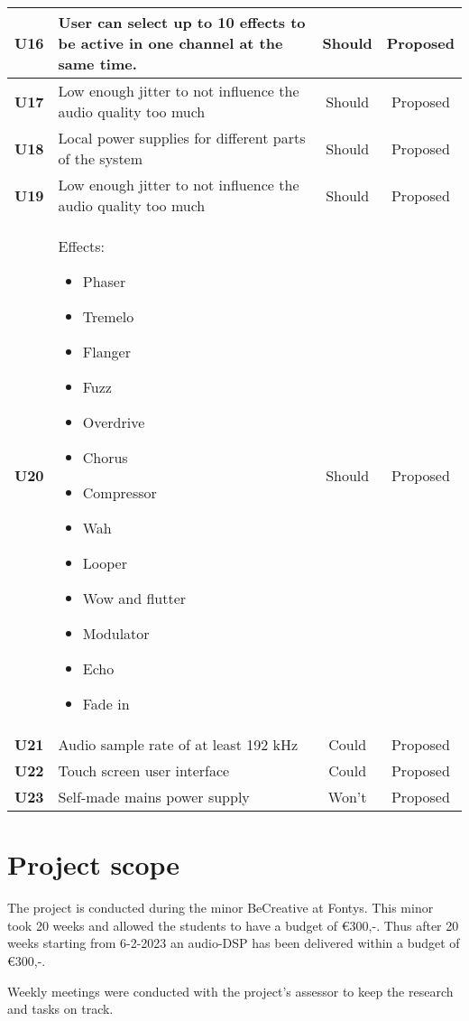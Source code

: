 \begin{longtable}{|c|p{10cm}|c|c|}
		\textbf{U16} & User can select up to 10 effects to be active in one channel at the same time. 								& Should & Proposed\\ \hline
		\textbf{U17} & Low enough jitter to not influence the audio quality too much 												& Should & Proposed\\ \hline
		\textbf{U18} & Local power supplies for different parts of the system 														& Should & Proposed\\ \hline
		\textbf{U19} & Low enough jitter to not influence the audio quality too much 												& Should & Proposed\\ \hline
		\textbf{U20} & Effects:\newline
		\begin{itemize}
			\setlength\itemsep{-0.3em}
			\item Phaser
			\item Tremelo
			\item Flanger
			\item Fuzz
			\item Overdrive
			\item Chorus
			\item Compressor
			\item Wah
			\item Looper
			\item Wow and flutter
			\item Modulator
			\item Echo
			\item Fade in
		\end{itemize}																												& Should & Proposed\\ \hline
		\textbf{U21} & Audio sample rate of at least 192 kHz 																		& Could  & Proposed\\ \hline
		\textbf{U22} & Touch screen user interface 																					& Could  & Proposed\\ \hline
		\textbf{U23} & Self-made mains power supply  																				& Won't  & Proposed\\ \hline
	\end{longtable}

\section{Project scope}

The project is conducted during the minor BeCreative at Fontys. This minor took 20 weeks and allowed the students to have a budget of €300,-. Thus after 20 weeks starting from 6-2-2023 an audio-DSP has been delivered within a budget of €300,-.
\par Weekly meetings were conducted with the project's assessor to keep the research and tasks on track.

